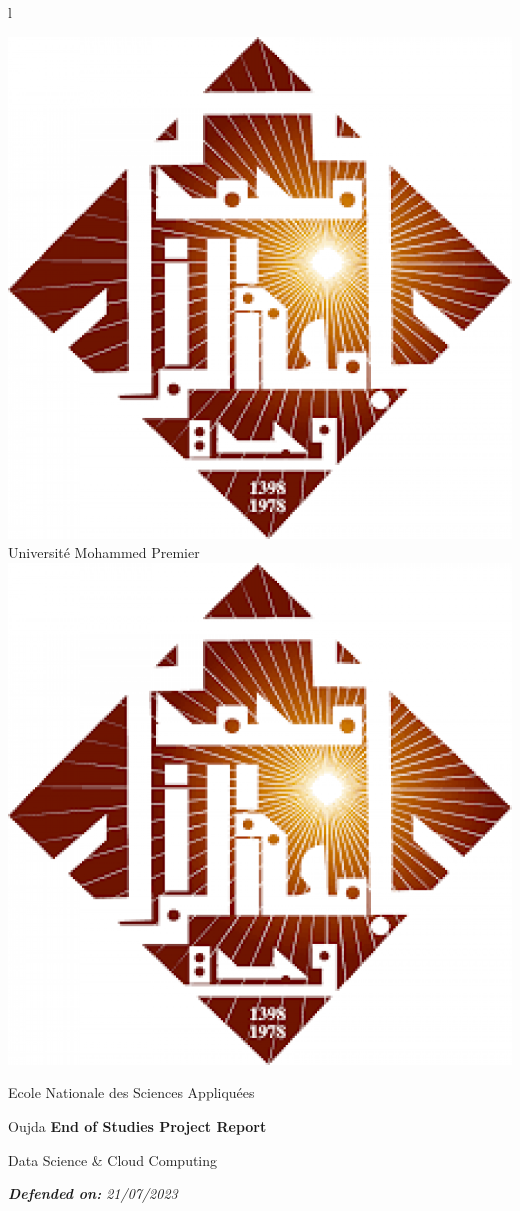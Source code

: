 l\documentclass[a4paper,12pt,twoside]{report}
\begin{document}
\begin{titlepage}

\selectfont

\begin{center}
    \includegraphics[scale=0.1]{images/ump}\hfill
    \LARGE Université Mohammed Premier\hfill
    \includegraphics[scale=0.1]{images/ump}\par
    \Large Ecole Nationale des Sciences Appliquées\par
    \Large Oujda\vfill
    \Large\textbf{End of Studies Project Report}\par
    \large Data Science \& Cloud Computing\par
    \textit{\textbf{Defended on:} 21/07/2023}\par
\end{center}




\end{titlepage}
\end{document}
